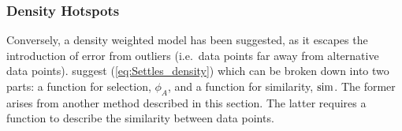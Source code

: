 






\subsubsection{Density Hotspots}
\label{sec:litRevDH}
Conversely, a density weighted model has been suggested, as it escapes the introduction of error from outliers (i.e.\ data points far away from alternative data points). \textcite{Set08} suggest (\ref{eq:Settles_density}) which can be broken down into two parts: a function for selection, $\phi_A$, and a function for similarity, $\operatorname*{sim}$. The former arises from  another method described in this section. The latter requires a function to describe the similarity between data points.

